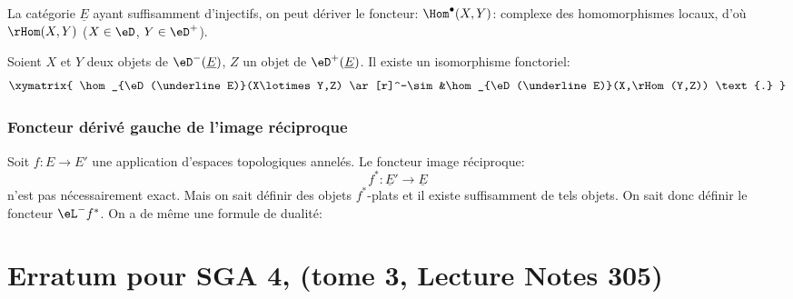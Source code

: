 La catégorie $\underline E$ ayant suffisamment d'injectifs, on peut 
dériver le foncteur: $\Hom^\bullet(X,Y)$: complexe des homomorphismes locaux,  
d'où $\rHom(X,Y)$ ($X\in \eD$, $Y\in \eD^+$). 

Soient $X$ et $Y$ deux objets de $\eD^-(\underline E)$, $Z$ un objet de 
$\eD^+(\underline E)$. Il existe un isomorphisme fonctoriel: 
\[\xymatrix{
  \hom_{\eD(\underline E)}(X\lotimes Y,Z) \ar[r]^-\sim 
    &\hom_{\eD(\underline E)}(X,\rHom(Y,Z)) \text{.}
}\]










\subsection{Foncteur dérivé gauche de l'image réciproque}\label{VIII:6-3}

Soit $f:E\to E'$ une application d'espaces topologiques annelés. Le 
foncteur image réciproque: 
\[
  f^\ast:\underline{E}' \to \underline E 
\]
n'est pas nécessairement exact. Mais on sait définir des objets 
$f^\ast$-plats et il existe suffisamment de tels objets. On sait donc 
définir le foncteur $\eL^- f^\ast$. On a de même une formule de dualité: 



















\appendix
\chapter{Erratum pour SGA 4, (tome 3, Lecture Notes 305)}

